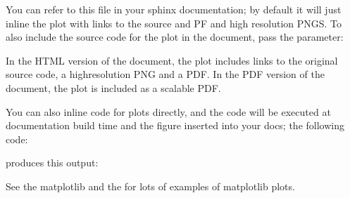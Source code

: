 \documentclass[letterpaper,10pt,english]{sphinxmanual}
\begin{document}
You can refer to this file in your sphinx documentation; by default it
will just inline the plot with links to the source and PF and high
resolution PNGS.  To also include the source code for the plot in the
document, pass the  parameter:

\begin{sphinxVerbatim}[commandchars=\\\{\}]
  
\end{sphinxVerbatim}

In the HTML version of the document, the plot includes links to the
original source code, a high\sphinxhyphen{}resolution PNG and a PDF.  In the PDF
version of the document, the plot is included as a scalable PDF.

You can also inline code for plots directly, and the code will be
executed at documentation build time and the figure inserted into your
docs; the following code:

\begin{sphinxVerbatim}[commandchars=\\\{\}]
 

      
      
     
     
    
\end{sphinxVerbatim}

produces this output:

See the matplotlib  and
the  for
lots of examples of matplotlib plots.
\end{document}
